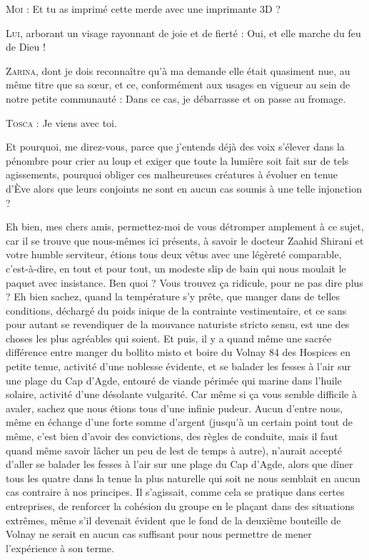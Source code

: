 \begin{dialogue}
\textsc{Moi} : Et tu as imprimé cette merde avec une imprimante 3D ?

\textsc{Lui}, arborant un visage rayonnant de joie et de fierté : Oui, et elle marche du feu de Dieu !

\textsc{Zarina}, dont je dois reconnaître qu’à ma demande elle était quasiment nue, au même titre que sa sœur, et ce, conformément aux usages en vigueur au sein de notre petite communauté : Dans ce cas, je débarrasse et on passe au fromage.

\textsc{Tosca} : Je viens avec toi.

\end{dialogue}

Et pourquoi, me direz-vous, parce que j’entends déjà des voix s’élever dans la pénombre pour crier au loup et exiger que toute la lumière soit fait sur de tels agissements, pourquoi obliger ces malheureuses créatures à évoluer en tenue d’Ève alors que leurs conjoints ne sont en aucun cas soumis à une telle injonction ?

Eh bien, mes chers amis, permettez-moi de vous détromper amplement à ce sujet, car il se trouve que nous-mêmes ici présents, à savoir le docteur Zaahid Shirani et votre humble serviteur, étions tous deux vêtus avec une légèreté comparable, c’est-à-dire, en tout et pour tout, un modeste slip de bain qui nous moulait le paquet avec insistance. Ben quoi ? Vous trouvez ça ridicule, pour ne pas dire plus ? Eh bien sachez, quand la température s’y prête, que manger dans de telles conditions, déchargé du poids inique de la contrainte vestimentaire, et ce sans pour autant se revendiquer de la mouvance naturiste stricto sensu, est une des choses les plus agréables qui soient. Et puis, il y a quand même une sacrée différence entre manger du bollito misto et boire du Volnay 84 des Hospices en petite tenue, activité d’une noblesse évidente, et se balader les fesses à l’air sur une plage du Cap d’Agde, entouré de viande périmée qui marine dans l’huile solaire, activité d’une désolante vulgarité. Car même si ça vous semble difficile à avaler, sachez que nous étions tous d’une infinie pudeur. Aucun d’entre nous, même en échange d’une forte somme d’argent (jusqu’à un certain point tout de même, c’est bien d’avoir des convictions, des règles de conduite, mais il faut quand même savoir lâcher un peu de lest de temps à autre), n’aurait accepté d’aller se balader les fesses à l’air sur une plage du Cap d’Agde, alors que dîner tous les quatre dans la tenue la plus naturelle qui soit ne nous semblait en aucun cas contraire à nos principes. Il s’agissait, comme cela se pratique dans certes entreprises, de renforcer la cohésion du groupe en le plaçant dans des situations extrêmes, même s’il devenait évident que le fond de la deuxième bouteille de Volnay ne serait en aucun cas suffisant pour nous permettre de mener l’expérience à son terme.

